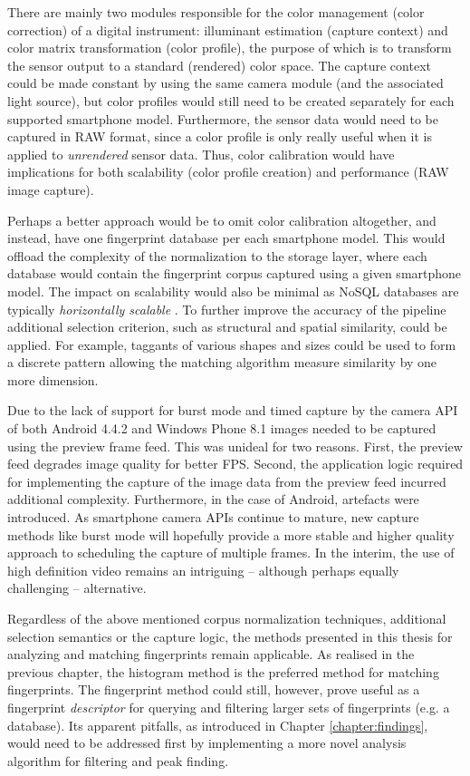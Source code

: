 \documentclass[thesis.tex]{subfiles}
\begin{document}
There are mainly two modules responsible for the color management (color correction) of a digital instrument: illuminant estimation (capture context) and color matrix transformation (color profile), the purpose of which is to transform the sensor output to a standard (rendered) color space. The capture context could be made constant by using the same camera module (and the associated light source), but color profiles would still need to be created separately for each supported smartphone model. Furthermore, the sensor data would need to be captured in RAW format, since a color profile is only really useful when it is applied to \emph{unrendered} sensor data. Thus, color calibration would have implications for both scalability (color profile creation) and performance (RAW image capture). \cite{multiple_cameras} \cite{color_correction_pipeline}

Perhaps a better approach would be to omit color calibration altogether, and instead, have one fingerprint database per each smartphone model. This would offload the complexity of the normalization to the storage layer, where each database would contain the fingerprint corpus captured using a given smartphone model. The impact on scalability would also be minimal as NoSQL databases are typically \emph{horizontally scalable} \cite{nosql_scalability}. To further improve the accuracy of the pipeline additional selection criterion, such as structural and spatial similarity, could be applied. For example, taggants of various shapes and sizes could be used to form a discrete pattern allowing the matching algorithm measure similarity by one more dimension. %

Due to the lack of support for burst mode and timed capture by the camera API of both Android 4.4.2 and Windows Phone 8.1 images needed to be captured using the preview frame feed. This was unideal for two reasons. First, the preview feed degrades image quality for better FPS. Second, the application logic required for implementing the capture of the image data from the preview feed incurred additional complexity. Furthermore, in the case of Android, artefacts were introduced. As smartphone camera APIs continue to mature, new capture methods like burst mode will hopefully provide a more stable and higher quality approach to scheduling the capture of multiple frames. In the interim, the use of high definition video remains an intriguing -- although perhaps equally challenging -- alternative.

Regardless of the above mentioned corpus normalization techniques, additional selection semantics or the capture logic, the methods presented in this thesis for analyzing and matching fingerprints remain applicable. As realised in the previous chapter, the histogram method is the preferred method for matching fingerprints. The fingerprint method could still, however, prove useful as a fingerprint \emph{descriptor} for querying and filtering larger sets of fingerprints (e.g. a database). Its apparent pitfalls, as introduced in Chapter \ref{chapter:findings}, would need to be addressed first by implementing a more novel analysis algorithm for filtering and peak finding.
\end{document}
